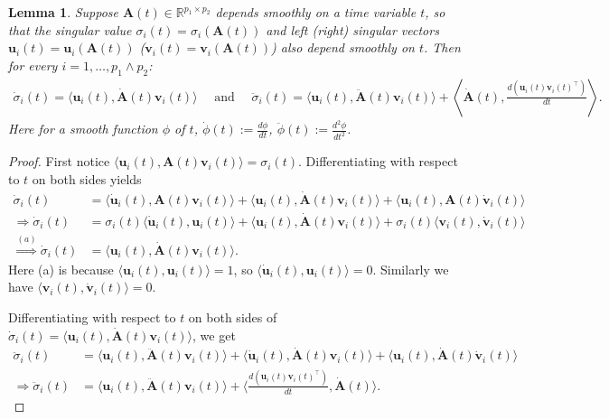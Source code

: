 \documentclass[11pt]{article}
\newtheorem{Lemma}{Lemma}
\newcommand{\bbR}{\mathbb{R}}
\newcommand{\0}{{\mathbf{0}}}
\newcommand{\1}{{\mathbf{1}}}
\renewcommand{\u}{{\mathbf{u}}}
\renewcommand{\v}{{\mathbf{v}}}
\newcommand{\A}{{\mathbf{A}}}
\begin{document}
\begin{Lemma} \label{lm: variation-formula-for-singular-values}
	Suppose $\A(t) \in \bbR^{p_1 \times p_2}$ depends smoothly on a time variable $t$, so that the singular value $\sigma_i(t) = \sigma_i(\A(t))$ and left (right) singular vectors $\u_i(t) = \u_i(\A(t))$ ($\v_i(t) = \v_i(\A(t))$) also depend smoothly on $t$. Then for every $i = 1, \ldots, p_1 \wedge p_2$:
	\begin{equation*}
		\begin{split}
			\dot{\sigma}_i(t) = \langle \u_i(t), \dot{\A}(t) \v_i(t) \rangle \quad \text{ and }\quad 
			\ddot{\sigma}_i(t) =\langle \u_i(t), \ddot{\A}(t) \v_i(t) \rangle + \left\langle \dot{\A}(t), \frac{d (\u_i(t) \v_i(t)^\top)}{dt} \right\rangle.
		\end{split}
	\end{equation*} Here for a smooth function $\phi$ of $t$, $\dot{\phi}(t) := \frac{d\phi }{dt}$, $\ddot{\phi}(t) := \frac{d^2 \phi}{dt^2}$.
\end{Lemma}
\begin{proof}
	First notice $\langle \u_i(t), \A(t) \v_i(t) \rangle = \sigma_i(t)$. Differentiating with respect to $t$ on both sides yields
	\begin{equation}\label{eq: first-order-derive}
	\begin{split}
		 \dot{\sigma}_i(t)&=\langle \dot{\u}_i(t), \A(t) \v_i(t) \rangle + \langle \u_i(t), \dot{\A}(t) \v_i(t) \rangle + \langle \u_i(t), \A(t) \dot{\v}_i(t) \rangle\\
		\Longrightarrow \dot{\sigma}_i(t)&=\sigma_i(t) \langle \dot{\u}_i(t), \u_i(t) \rangle + \langle \u_i(t), \dot{\A}(t) \v_i(t) \rangle + \sigma_i(t)\langle \v_i(t), \dot{\v}_i(t) \rangle\\
		\overset{(a)}\Longrightarrow \dot{\sigma}_i(t) &=  \langle \u_i(t), \dot{\A}(t) \v_i(t) \rangle.
	\end{split}
	\end{equation} Here (a) is because $\langle \u_i(t), \u_i(t) \rangle = 1$, so $\langle \dot{\u}_i(t), \u_i(t) \rangle = 0$. Similarly we have $\langle \v_i(t), \dot{\v}_i(t) \rangle = 0$.
	
	Differentiating with respect to $t$ on both sides of $\dot{\sigma}_i(t) = \langle \u_i(t), \dot{\A}(t) \v_i(t) \rangle$, we get
	\begin{equation*}
		\begin{split}
			\ddot{\sigma}_i(t) &= \langle \u_i(t), \ddot{\A}(t) \v_i(t) \rangle + \langle \dot{\u}_i(t), \dot{\A}(t) \v_i(t) \rangle + \langle \u_i(t), \dot{\A}(t) \dot{\v}_i(t) \rangle \\
			\Longrightarrow  \ddot{\sigma}_i(t) &= \langle \u_i(t), \ddot{\A}(t) \v_i(t) \rangle + \langle \frac{d (\u_i(t) \v_i(t)^\top)}{dt}, \dot{\A}(t) \rangle .
		\end{split}
	\end{equation*}
\end{proof}
\end{document}
